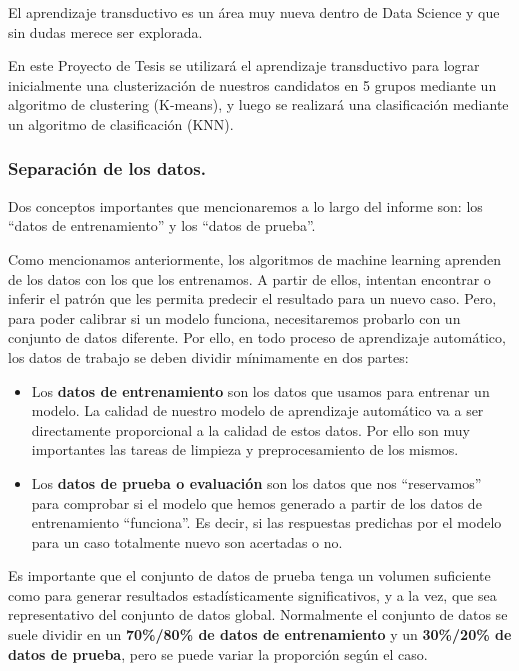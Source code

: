\documentclass[12pt,a4paper]{article}
\begin{document}
\begin{sloppypar}
El aprendizaje transductivo es un área muy nueva dentro de Data Science y que sin dudas merece ser explorada.

En este Proyecto de Tesis se utilizará el aprendizaje transductivo para lograr inicialmente una clusterización de nuestros candidatos en 5 grupos mediante un algoritmo de clustering (K-means), y luego se realizará una clasificación mediante un algoritmo de clasificación (KNN). 

\subsubsection{Separación de los datos.}\label{Separacion datos}

Dos conceptos importantes que mencionaremos a lo largo del informe son: los “datos de entrenamiento” y los “datos de prueba”.

Como mencionamos anteriormente, los algoritmos de machine learning aprenden de los datos con los que los entrenamos. A partir de ellos, intentan encontrar o inferir el patrón que les permita predecir el resultado para un nuevo caso. Pero, para poder calibrar si un modelo funciona, necesitaremos probarlo con un conjunto de datos diferente. Por ello, en todo proceso de aprendizaje automático, los datos de trabajo se deben dividir mínimamente en dos partes:

\begin{itemize}
\item Los \textbf{datos de entrenamiento} son los datos que usamos para entrenar un modelo. La calidad de nuestro modelo de aprendizaje automático va a ser directamente proporcional a la calidad de estos datos. Por ello son muy importantes las tareas de limpieza y preprocesamiento de los mismos.
\item Los \textbf{datos de prueba o evaluación} son los datos que nos “reservamos” para comprobar si el modelo que hemos generado a partir de los datos de entrenamiento “funciona”.  Es decir, si las respuestas predichas por el modelo para un caso totalmente nuevo son acertadas o no.
\end{itemize}


Es importante que el conjunto de datos de prueba tenga un volumen suficiente como para generar resultados estadísticamente significativos, y a la vez, que sea representativo del conjunto de datos global. Normalmente el conjunto de datos se suele dividir en un \textbf{70\%/80\% de datos de entrenamiento} y un \textbf{30\%/20\% de datos de prueba}, pero se puede variar la proporción según el caso\cite{apunte_uba}. 



\end{sloppypar}
\end{document}
